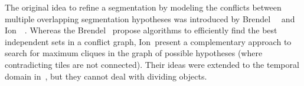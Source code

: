 \documentclass[10pt,twocolumn,letterpaper]{article}
\newcommand{\red}{\color{red}}
\begin{document}
The original idea to refine a segmentation by modeling the conflicts between multiple overlapping segmentation hypotheses
was introduced by Brendel~\etal~\cite{brendel_10_segmentation} and Ion~\etal~\cite{ion_11_image}. Whereas the Brendel~\etal
propose algorithms
to efficiently find the best independent sets in a conflict graph, Ion~\etal present a complementary approach to
search for maximum cliques in the graph of possible hypotheses (where contradicting tiles are not connected). Their ideas
were extended to the temporal domain in~\cite{brendel_11_multiobject}, but they cannot deal with dividing objects.





\end{document}
